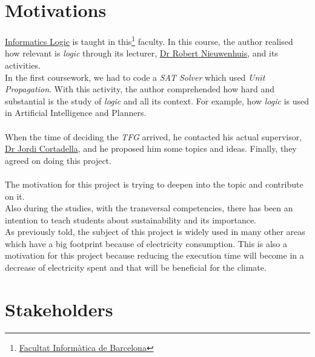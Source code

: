 



\section{Motivations}

\href{https://www.fib.upc.edu/en/studies/bachelors-degrees/bachelor-degree-informatics-engineering/curriculum/syllabus/LI}{Informatics Logic} is taught in this\footnote{\href{https://www.fib.upc.edu/en/}{Facultat Informàtica de Barcelona}} faculty. In this course, the author realised how relevant is \emph{logic} through its lecturer, \href{http://www.lsi.upc.es/~roberto/}{Dr Robert Nieuwenhuis}, and its activities. \\
In the first coursework, we had to code a \emph{SAT Solver} which used \emph{Unit Propagation}.
With this activity, the author comprehended how hard and substantial is the study of \emph{logic} and all its context. For example, how \emph{logic} is used in Artificial Intelligence and Planners.\\\\
When the time of deciding the \emph{TFG} arrived, he contacted his actual supervisor, \href{https://www.cs.upc.edu/~jordicf/}{Dr Jordi Cortadella}, and he proposed him some topics and ideas. Finally, they agreed on doing this project. \\\\
The motivation for this project is trying to deepen into the topic and contribute on it.\\
Also during the studies, with the transversal competencies, there has been an intention to teach students about sustainability and its importance.\\ %
As previously told, the subject of this project is widely used in many other areas which have a big footprint because of electricity consumption. This is also a motivation for this project because reducing the execution time will become in a decrease of electricity spent and that will be beneficial for the climate.  

\section{Stakeholders}

